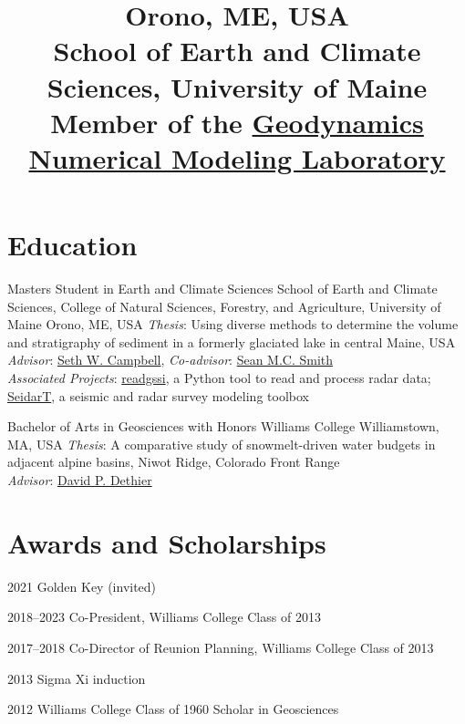 \documentclass[a4paper,12pt,sans,colorlinks]{moderncv}
\title{%
    \small
    Orono, ME, USA
    \\
    School of Earth and Climate Sciences, University of Maine
    \\
    Member of the
    \href{http://wiki.geodynamics.umaine.edu/}{Geodynamics Numerical Modeling Laboratory}
}
\newcommand{\seth}{\href{https://www.alpinesciences.net}{Seth W. Campbell}}
\newcommand{\sean}{\href{https://umaine.edu/earthclimate/people/sean-m-c-smith/}{Sean M.C. Smith}}
\newcommand{\david}{\href{https://geosciences.williams.edu/profile/ddethier/}{David P. Dethier}}
\newcommand{\rsudp}{\href{https://github.com/iannesbitt/readgssi}{readgssi}}
\newcommand{\seidart}{\href{https://github.com/UMainedynamics/SeidarT}{SeidarT}}
\begin{document}

\maketitle
\vspace{-3em}


\section{Education}

{Masters Student in Earth and Climate Sciences}
{School of Earth and Climate Sciences,
College of Natural Sciences, Forestry, and Agriculture,
University of Maine}
{Orono, ME, USA}
{}
{
    \emph{Thesis}: Using diverse methods to determine the volume and stratigraphy
    of sediment in a formerly glaciated lake in central Maine, USA
    \\
    \emph{Advisor}: \seth{}, \emph{Co-advisor}: \sean{}
    \\
    \emph{Associated Projects}: \rsudp{}, a Python tool to read and process radar data;
    \seidart{}, a seismic and radar survey modeling toolbox
}

{Bachelor of Arts in Geosciences with Honors}
{Williams College}
{Williamstown, MA, USA}
{}
{
    \emph{Thesis}: A comparative study of snowmelt-driven water budgets in
    adjacent alpine basins, Niwot Ridge, Colorado Front Range
    \\
    \emph{Advisor}: \david{}
}


\section{Awards and Scholarships}

\cvline
{2021}
{Golden Key (invited)}

\cvline
{2018--2023}
{Co-President, Williams College Class of 2013}

\cvline
{2017--2018}
{Co-Director of Reunion Planning, Williams College Class of 2013}

\cvline
{2013}
{Sigma Xi induction}

\cvline
{2012}
{Williams College Class of 1960 Scholar in Geosciences}
\end{document}
